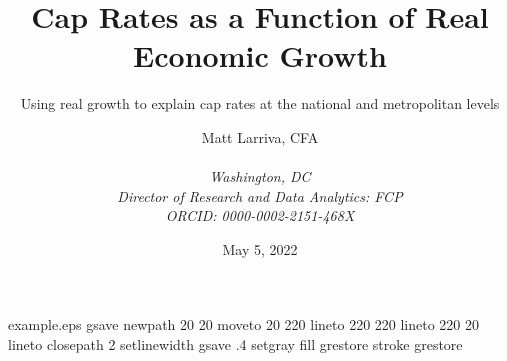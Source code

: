\begin{filecontents*}{example.eps}
gsave
newpath
  20 20 moveto
  20 220 lineto
  220 220 lineto
  220 20 lineto
closepath
2 setlinewidth
gsave
  .4 setgray fill
grestore
stroke
grestore
\end{filecontents*}

\RequirePackage{fix-cm}
\documentclass{svjour3}                     %
\smartqed  %
\usepackage{graphicx}


\usepackage{natbib}
\usepackage{csvsimple}
\usepackage{breakcites}
\usepackage{caption}
\usepackage{blindtext}
\usepackage{amsmath}
\usepackage{float}
\usepackage{graphicx}
\usepackage{geometry}
\usepackage{longtable,array}
\usepackage{subfig}
\usepackage{graphicx}
\usepackage{url}
\captionsetup[figure]{font=normalsize}
\usepackage{pdflscape}
\usepackage [english]{babel}
\usepackage [autostyle, english = american]{csquotes}



\title{Cap Rates as a Function of Real Economic Growth}
\date{May 5, 2022}
\subtitle{Using real growth to explain cap rates at the national and metropolitan levels}
\author{Matt Larriva, CFA         \\
              \\
             \emph{Washington, DC}   \\
             \emph{Director of Research and Data Analytics: FCP}\\ %
             \emph{ORCID: 0000-0002-2151-468X}
}





\maketitle

